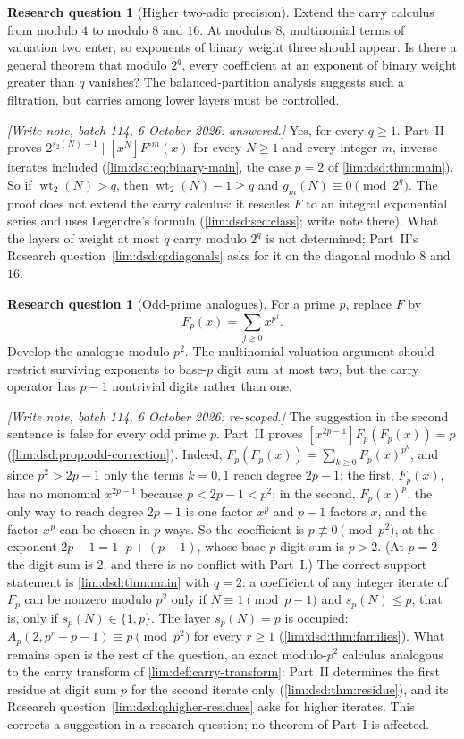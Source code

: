 \documentclass[11pt]{article}
\theoremstyle{definition}
\newtheorem{question}[theorem]{Research question}
\theoremstyle{remark}
\newcommand{\wt}{\operatorname{wt}_2}
\begin{document}
\begin{question}[Higher two-adic precision]
\label{lim:q:higher-precision}
Extend the carry calculus from modulo $4$ to modulo $8$ and $16$.  At modulus
$8$, multinomial terms of valuation two enter, so exponents of binary weight
three should appear.  Is there a general theorem that modulo $2^q$, every
coefficient at an exponent of binary weight greater than $q$ vanishes?
The balanced-partition analysis suggests such a filtration, but carries among
lower layers must be controlled.
\end{question}

\emph{[Write note, batch 114, 6 October 2026: answered.]} Yes, for every $q\ge1$. Part~II proves
$2^{s_2(N)-1}\mid[x^N]F^{\circ m}(x)$ for every $N\ge1$ and every integer $m$, inverse
iterates included (\eqref{lim:dsd:eq:binary-main}, the case $p=2$ of
\cref{lim:dsd:thm:main}). So if $\wt(N)>q$, then $\wt(N)-1\ge q$ and
$g_m(N)\equiv0\pmod{2^q}$. The proof does not extend the carry calculus: it
rescales $F$ to an integral exponential series and uses Legendre's formula
(\cref{lim:dsd:sec:class}; write note there). What the layers of weight at
most $q$ carry modulo $2^q$ is not determined; Part~II's Research
question~\ref{lim:dsd:q:diagonals} asks for it on the diagonal modulo $8$
and~$16$.

\begin{question}[Odd-prime analogues]
\label{lim:q:odd-prime}
For a prime $p$, replace $F$ by
\[
  F_p(x)=\sum_{j\ge0}x^{p^j}.
\]
Develop the analogue modulo $p^2$.  The multinomial valuation argument should
restrict surviving exponents to base-$p$ digit sum at most two, but the carry
operator has $p-1$ nontrivial digits rather than one.
\end{question}

\emph{[Write note, batch 114, 6 October 2026: re-scoped.]} The suggestion in the second sentence is
false for every odd prime $p$. Part~II proves
$[x^{2p-1}]F_p(F_p(x))=p$ (\cref{lim:dsd:prop:odd-correction}). Indeed,
$F_p(F_p(x))=\sum_{k\ge0}F_p(x)^{p^k}$, and since $p^2>2p-1$ only the terms
$k=0,1$ reach degree $2p-1$; the first, $F_p(x)$, has no monomial
$x^{2p-1}$ because $p<2p-1<p^2$; in the second, $F_p(x)^p$, the only way to
reach degree $2p-1$ is one factor $x^p$ and $p-1$ factors $x$, and the
factor $x^p$ can be chosen in $p$ ways. So the coefficient is
$p\not\equiv0\pmod{p^2}$, at the exponent $2p-1=1\cdot p+(p-1)$, whose
base-$p$ digit sum is $p>2$. (At $p=2$ the digit sum is $2$, and there is no
conflict with Part~I.) The correct support statement is \cref{lim:dsd:thm:main}
with $q=2$: a coefficient of any integer iterate of $F_p$ can be nonzero
modulo $p^2$ only if $N\equiv1\pmod{p-1}$ and $s_p(N)\le p$, that is, only
if $s_p(N)\in\{1,p\}$. The layer $s_p(N)=p$ is occupied:
$A_p(2,p^r+p-1)\equiv p\pmod{p^2}$ for every $r\ge1$
(\cref{lim:dsd:thm:families}). What remains open is the rest of the
question, an exact modulo-$p^2$ calculus analogous to the carry transform
of \cref{lim:def:carry-transform}: Part~II determines the first residue at
digit sum $p$ for the second iterate only (\cref{lim:dsd:thm:residue}), and
its Research question~\ref{lim:dsd:q:higher-residues} asks for higher
iterates. This corrects a suggestion in a research question; no theorem of
Part~I is affected.
\end{document}
